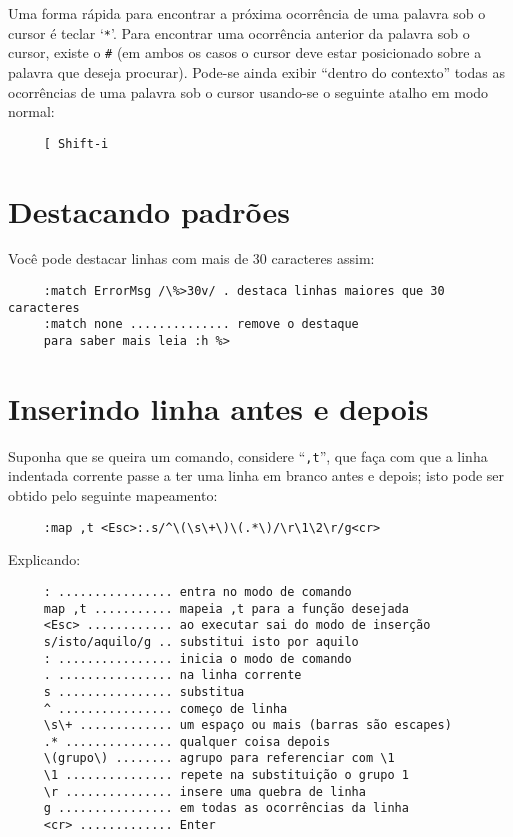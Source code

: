 {\Large {}} Uma forma rápida para encontrar a próxima ocorrência de uma
palavra sob o cursor é teclar `\verb|*|'. Para encontrar uma ocorrência anterior
da palavra sob o cursor, existe o \verb|#| (em ambos os casos o cursor deve
estar posicionado sobre a palavra que deseja procurar). Pode-se ainda exibir 
``dentro do contexto'' todas as ocorrências de uma palavra sob o cursor usando-se 
o seguinte atalho em modo normal:

\begin{verbatim}
     [ Shift-i
\end{verbatim}

\section{Destacando padrões}
\label{sec:Destacando padrões}

Você pode destacar linhas com mais de 30 caracteres assim:

\begin{verbatim}
     :match ErrorMsg /\%>30v/ . destaca linhas maiores que 30 caracteres
     :match none .............. remove o destaque
     para saber mais leia :h %>
\end{verbatim}

\section{Inserindo linha antes e depois}

Suponha que se queira um comando, considere ``\verb|,t|'', que faça com que a
linha indentada corrente passe a ter uma linha em branco antes e depois; isto
pode ser obtido pelo seguinte mapeamento:

\begin{verbatim}
     :map ,t <Esc>:.s/^\(\s\+\)\(.*\)/\r\1\2\r/g<cr>
\end{verbatim}

Explicando:

\begin{verbatim}
     : ................ entra no modo de comando
     map ,t ........... mapeia ,t para a função desejada
     <Esc> ............ ao executar sai do modo de inserção
     s/isto/aquilo/g .. substitui isto por aquilo
     : ................ inicia o modo de comando
     . ................ na linha corrente
     s ................ substitua
     ^ ................ começo de linha
     \s\+ ............. um espaço ou mais (barras são escapes)
     .* ............... qualquer coisa depois
     \(grupo\) ........ agrupo para referenciar com \1
     \1 ............... repete na substituição o grupo 1
     \r ............... insere uma quebra de linha
     g ................ em todas as ocorrências da linha
     <cr> ............. Enter
\end{verbatim}

